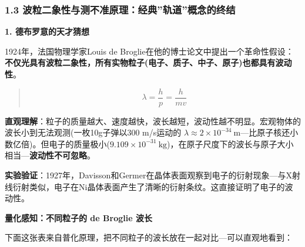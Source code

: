 \subsubsection{1.3 波粒二象性与测不准原理：经典''轨道''概念的终结}\label{ux6ce2ux7c92ux4e8cux8c61ux6027ux4e0eux6d4bux4e0dux51c6ux539fux7406ux7ecfux5178ux8f68ux9053ux6982ux5ff5ux7684ux7ec8ux7ed3}

\textbf{1. 德布罗意的天才猜想}

1924年，法国物理学家Louis de Broglie在他的博士论文中提出一个革命性假设：\textbf{不仅光具有波粒二象性，所有实物粒子(电子、质子、中子、原子)也都具有波动性}。

\begin{quote}
\[\lambda = \frac{h}{p} = \frac{h}{mv}\]
\end{quote}

\textbf{直观理解}：粒子的质量越大、速度越快，波长越短，波动性越不明显。宏观物体的波长小到无法观测(一枚10g子弹以300 m/s运动的 \(\lambda \approx 2\times 10^{-34}\ \mathrm{m}\)---比原子核还小数亿倍)。但电子的质量极小(\(9.109\times 10^{-31}\ \mathrm{kg}\))，在原子尺度下的波长与原子大小相当---\textbf{波动性不可忽略}。

\textbf{实验验证}：1927年，Davisson和Germer在晶体表面观察到电子的衍射现象---与X射线衍射类似，电子在Ni晶体表面产生了清晰的衍射条纹。这直接证明了电子的波动性。

\textbf{量化感知：不同粒子的 de Broglie 波长}

下面这张表来自普化原理，把不同粒子的波长放在一起对比---可以直观地看到：

